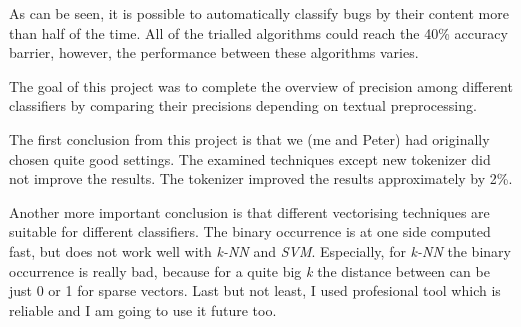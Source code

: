  
As can be seen, it is possible to automatically classify bugs by their content more than half of the time. All of the trialled algorithms could reach the 40\% accuracy barrier, however, the performance between these algorithms varies. 

The goal of this project was to complete the overview of precision among different classifiers by comparing their precisions depending on textual preprocessing.

The first conclusion from this project is that we (me and Peter) had originally chosen quite good settings. 
The examined techniques except new tokenizer did not improve the results. The tokenizer improved the results approximately by 2\%.

Another more important conclusion is that different vectorising 
techniques are suitable for different classifiers.
The binary occurrence is at one side computed fast, but does not work well with {\it k-NN} and {\it SVM}. Especially, for {\it k-NN} the binary occurrence is really bad, because for a quite big {\it k} the distance between can be just 0 or 1 for sparse vectors.   
Last but not least, I used profesional tool which is reliable
and I am going to use it future too.
